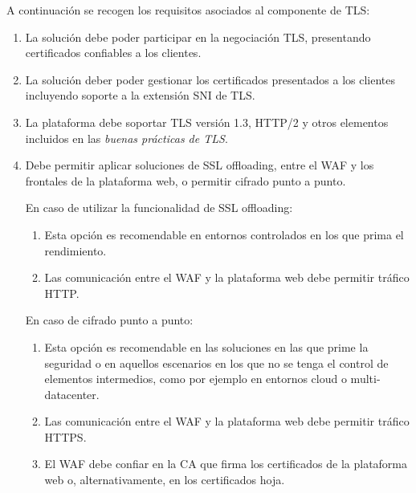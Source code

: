 \par A continuación se recogen los requisitos asociados al componente de TLS:
\begin{enumerate}
  \item La solución debe poder participar en la negociación TLS, presentando certificados confiables a los clientes.
  \item La solución deber poder gestionar los certificados presentados a los clientes incluyendo soporte a la extensión \acrshort{SNI} de TLS.
  \item La plataforma debe soportar TLS versión 1.3, HTTP/2 y otros elementos incluidos en las {\em buenas prácticas de TLS\cite{TLSBestPractices}}.
  \item Debe permitir aplicar soluciones de SSL offloading, entre el WAF y los frontales de la plataforma web, o permitir cifrado punto a punto.
    \par En caso de utilizar la funcionalidad de SSL offloading:
      \begin{enumerate}[label=\emph{\alph*})]
        \item Esta opción es recomendable en entornos controlados en los que prima el rendimiento.
        \item Las comunicación entre el WAF y la plataforma web debe permitir tráfico HTTP.
      \end{enumerate}
    \par En caso de cifrado punto a punto:
      \begin{enumerate}[label=\emph{\alph*})]
        \item Esta opción es recomendable en las soluciones en las que prime la seguridad o en aquellos escenarios en los que no se tenga el control de elementos intermedios, como por ejemplo en entornos cloud o multi-datacenter.
        \item Las comunicación entre el WAF y la plataforma web debe permitir tráfico HTTPS.
        \item El WAF debe confiar en la CA que firma los certificados de la plataforma web o, alternativamente, en los certificados hoja.
      \end{enumerate}
\end{enumerate}

